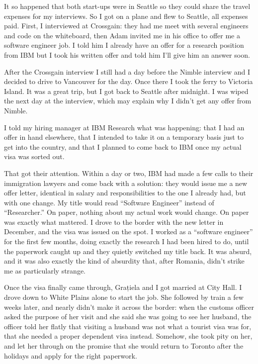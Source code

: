 \documentclass[12pt]{book}
\begin{document}
It so happened that both start-ups were in Seattle so they could share
the travel expenses for my interviews. So I got on a plane and flew to
Seattle, all expenses paid. First, I interviewed at Crossgain: they had
me meet with several engineers and code on the whiteboard, then Adam
invited me in his office to offer me a software engineer job. I told him
I already have an offer for a research position from IBM but I took his
written offer and told him I'll give him an answer soon.

After the Crossgain interview I still had a day before the Nimble
interview and I decided to drive to Vancouver for the day. Once there I
took the ferry to Victoria Island. It was a great trip, but I got back
to Seattle after midnight. I was wiped the next day at the interview,
which may explain why I didn't get any offer from Nimble.

I told my hiring manager at IBM Research what was happening: that I had
an offer in hand elsewhere, that I intended to take it on a temporary
basis just to get into the country, and that I planned to come back to
IBM once my actual visa was sorted out.

That got their attention. Within a day or two, IBM had made a few calls
to their immigration lawyers and come back with a solution: they would
issue me a new offer letter, identical in salary and responsibilities to
the one I already had, but with one change. My title would read
``Software Engineer'' instead of ``Researcher.'' On paper, nothing about
my actual work would change. On paper was exactly what mattered. I drove
to the border with the new letter in December, and the visa was issued
on the spot. I worked as a ``software engineer'' for the first few
months, doing exactly the research I had been hired to do, until the
paperwork caught up and they quietly switched my title back. It was
absurd, and it was also exactly the kind of absurdity that, after
Romania, didn't strike me as particularly strange.

Once the visa finally came through, Grațiela and I got married at City
Hall. I drove down to White Plains alone to start the job. She followed
by train a few weeks later, and nearly didn't make it across the border:
when the customs officer asked the purpose of her visit and she said she
was going to see her husband, the officer told her flatly that visiting
a husband was not what a tourist visa was for, that she needed a proper
dependent visa instead. Somehow, she took pity on her, and let her
through on the promise that she would return to Toronto after the
holidays and apply for the right paperwork.
\end{document}
